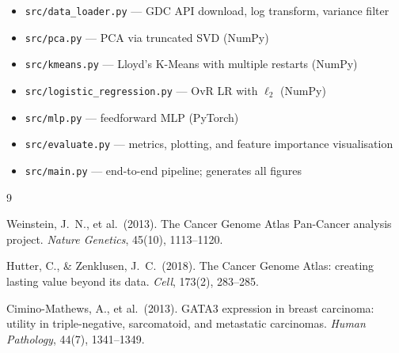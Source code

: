 \documentclass[11pt,letterpaper]{article}
\begin{document}
\begin{itemize}[leftmargin=2em,itemsep=0pt]
  \item \texttt{src/data\_loader.py} --- GDC API download, log transform, variance filter
  \item \texttt{src/pca.py} --- PCA via truncated SVD (NumPy)
  \item \texttt{src/kmeans.py} --- Lloyd's K-Means with multiple restarts (NumPy)
  \item \texttt{src/logistic\_regression.py} --- OvR LR with $\ell_2$ (NumPy)
  \item \texttt{src/mlp.py} --- feedforward MLP (PyTorch)
  \item \texttt{src/evaluate.py} --- metrics, plotting, and feature importance visualisation
  \item \texttt{src/main.py} --- end-to-end pipeline; generates all figures
\end{itemize}


\begin{thebibliography}{9}

Weinstein, J.~N., et al.\ (2013).
The Cancer Genome Atlas Pan-Cancer analysis project.
\textit{Nature Genetics}, 45(10), 1113--1120.

Hutter, C., \& Zenklusen, J.~C.\ (2018).
The Cancer Genome Atlas: creating lasting value beyond its data.
\textit{Cell}, 173(2), 283--285.

Cimino-Mathews, A., et al.\ (2013).
GATA3 expression in breast carcinoma: utility in triple-negative, sarcomatoid,
and metastatic carcinomas.
\textit{Human Pathology}, 44(7), 1341--1349.

\end{thebibliography}
\end{document}
